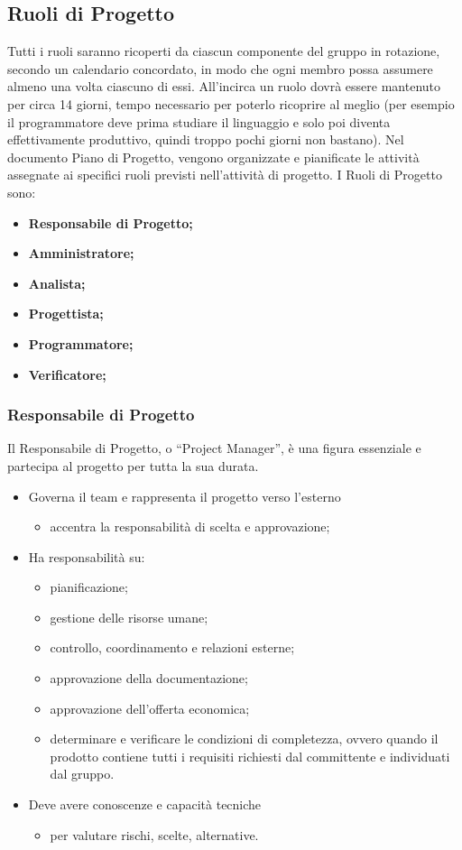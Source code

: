 \subsection{Ruoli di Progetto}
Tutti i ruoli saranno ricoperti da ciascun componente del gruppo in rotazione, secondo un calendario concordato, in modo che ogni membro possa assumere almeno una volta ciascuno di essi. All'incirca un ruolo dovrà essere mantenuto per circa 14 giorni, tempo necessario per poterlo ricoprire al meglio (per esempio il programmatore deve prima studiare il linguaggio e solo poi diventa effettivamente produttivo, quindi troppo pochi giorni non bastano).
Nel documento Piano di Progetto, vengono organizzate e pianificate le attività assegnate ai specifici ruoli previsti nell’attività di progetto. I Ruoli di Progetto sono:
\begin{itemize}
\item{\textbf{Responsabile di Progetto;}}
\item{\textbf{Amministratore;}}
\item{\textbf{Analista;}}
\item{\textbf{Progettista;}}
\item{\textbf{Programmatore;}}
\item{\textbf{Verificatore;}}
\end{itemize}

\subsubsection{Responsabile di Progetto}
Il Responsabile di Progetto,  o  “Project  Manager”,  è una figura essenziale e partecipa al  progetto per tutta la sua durata.  
\begin{itemize}
\item{Governa il team e rappresenta il progetto verso l'esterno}
	\begin{itemize}
	\item{accentra la responsabilità di scelta e approvazione;}
	\end{itemize}
\item{Ha responsabilità su:}
	\begin{itemize}
	\item{pianificazione;}
	\item{gestione delle risorse umane;}
	\item{controllo, coordinamento e relazioni esterne;}
	\item{approvazione della documentazione;}
	\item{approvazione dell’offerta economica;}
	\item{determinare e verificare le condizioni di completezza, ovvero quando il prodotto contiene tutti i requisiti richiesti dal committente e individuati dal gruppo.}
	\end{itemize}
\item{Deve avere conoscenze e capacità tecniche}
	\begin{itemize}
	\item{per valutare rischi, scelte, alternative.}
	\end{itemize}
\end{itemize}

